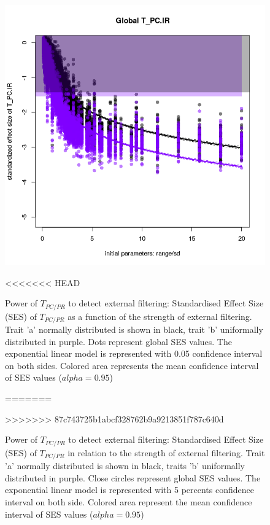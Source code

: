 \documentclass[12pt]{article}\usepackage[]{graphicx}\usepackage[]{color}
\makeatletter
\def\maxwidth{ %
  \ifdim\Gin@nat@width>\linewidth
    \linewidth
  \else
    \Gin@nat@width
  \fi
}
\newenvironment{knitrout}{}{} %
\makeatother
\begin{document}
\begin{landscape}
\begin{table}[ht]
{\begin{table}[ht]
{\begin{table}[ht]
{\begin{knitrout}
\begin{figure}
{\centering \includegraphics[width=\maxwidth]{figure/Ex_conc_plot2-1} 

}

<<<<<<< HEAD
\caption[Power of $T_{PC/PR}$ to detect external filtering]{Power of $T_{PC/PR}$ to detect external filtering: Standardised Effect Size (SES) of $T_{PC/PR}$ as a function of the strength of external filtering. Trait 'a' normally distributed is shown in black, trait 'b' uniformally distributed in purple. Dots represent global SES values. The exponential linear model is represented with 0.05 confidence interval on both sides. Colored area represents the mean confidence interval of SES values ($alpha = 0.95$)}\label{fig:Ex_conc_plot2}
=======
\caption[Power of $T_{PC/PR}$ to detect external filtering]{Power of $T_{PC/PR}$ to detect external filtering: Standardised Effect Size (SES) of $T_{PC/PR}$ in relation to the strength of external filtering. Trait 'a' normally distributed is shown in black, traits 'b' uniformally distributed in purple. Close circles represent global SES values. The exponential linear model is represented with 5 percents confidence interval on both side. Colored area represent the mean confidence interval of SES values ($alpha = 0.95$)}\label{fig:Ex_conc_plot2}
>>>>>>> 87c743725b1abcf328762b9a9213851f787c640d
\end{figure}



\end{knitrout}}
\end{table}}
\end{table}}
\end{table}
\end{landscape}
\end{document}

